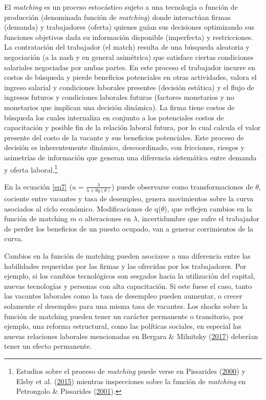 \documentclass[12pt,oneside]{reedthesis}
\begin{document}
El \emph{matching} es un proceso estocástico sujeto a una tecnología o función de producción (denominada función de \emph{matching}) donde interactúan firmas (demanda) y trabajadores (oferta) quienes guían sus decisiones optimizando sus funciones objetivos dada su información disponible (imperfecta) y restricciones. La contratación del trabajador (el match) resulta de una búsqueda aleatoria y negociación (a la nash y en general asimétrica) que satisface ciertas condiciones salariales negociadas por ambas partes.
En este proceso el trabajador incurre en costos de búsqueda y pierde beneficios potenciales en otras actividades, valora el ingreso salarial y condiciones laborales presentes (decisión estática) y el flujo de ingresos futuros y condiciones laborales futuras (factores monetarios y no monetarios que implican una decisión dinámica). La firma tiene costos de búsqueda los cuales internaliza en conjunto a los potenciales costos de capacitación y posible fin de la relación laboral futura, por lo cual calcula el valor presente del costo de la vacante y sus beneficios potenciales. Este proceso de decisión es inherentemente dinámico, descoordinado, con fricciones, riesgos y asimetrías de información que generan una diferencia sistemática entre demanda y oferta laboral.\footnote{Estudios sobre el proceso de \emph{matching} puede verse en Pissarides (\protect\hyperlink{ref-Pissarides2000}{2000}) y Elsby et al. (\protect\hyperlink{ref-Elsby2015}{2015}) mientras inspecciones sobre la función de \emph{matching} en Petrongolo \& Pissarides (\protect\hyperlink{ref-Petrongolo2001}{2001}).}

En la ecuación \eqref{eq7} (\(u = \frac{\lambda}{\lambda+\theta q(\theta)}\)) puede observarse como transformaciones de \(\theta\), cociente entre vacantes y tasa de desempleo, genera movimientos sobre la curva asociados al ciclo económico. Modificaciones de q(\(\theta\)), que reflejen cambios en la función de matching \(m\) o alteraciones en \(\lambda\), incertidumbre que sufre el trabajador de perder los beneficios de un puesto ocupado, van a generar corrimientos de la curva.

Cambios en la función de matching pueden asociarse a una diferencia entre las habilidades requeridas por las firmas y las ofrecidas por los trabajadores. Por ejemplo, si los cambios tecnológicos son sesgados hacia la utilización del capital, nuevas tecnologías y personas con alta capacitación. Si este fuese el caso, tanto las vacantes laborales como la tasa de desempleo pueden aumentar, o crecer solamente el desempleo para una misma tasa de vacantes. Los shocks sobre la función de matching pueden tener un carácter permanente o transitorio, por ejemplo, una reforma estructural, como las políticas sociales, en especial las nuevas relaciones laborales mencionadas en Bergara \& Milnitsky (\protect\hyperlink{ref-Bergara2017}{2017}) deberían tener un efecto permanente.
\end{document}

